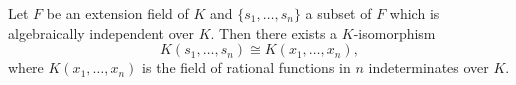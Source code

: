Let $F$ be an extension field of $K$ and $\{s_1, \ldots, s_n\}$ a subset of $F$ which is algebraically independent over $K$. Then there exists a $K$-isomorphism
\[
K(s_1, \ldots, s_n) \cong K(x_1, \ldots, x_n),
\]
where $K(x_1, \ldots, x_n)$ is the field of rational functions in $n$ indeterminates over $K$.
